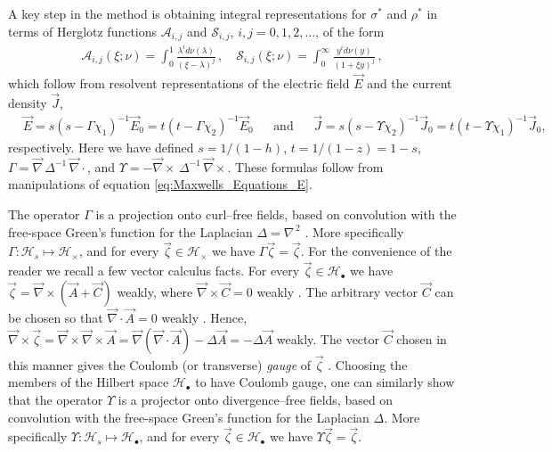 \documentclass[english,12pt,jmp,graphicx]{revtex4-1}
\begin{document}
A key step in the method is obtaining integral representations for
$\sigma^*$ and $\rho^*$ in terms of Herglotz functions $\mathcal{A}_{i,j}$ and
$\mathcal{S}_{i,j}$, $i,j=0,1,2,\ldots$, of the form \cite{Henrici:1974:v3}  
%
\begin{align}\label{eq:Integral_Reps}
  \mathcal{A}_{i,j}(\xi;\nu)=\int_0^1\frac{\lambda^id\nu(\lambda)}{(\xi-\lambda)^j}\,, \quad  
  \mathcal{S}_{i,j}(\xi;\nu)=\int_0^\infty\frac{y^id\nu(y)}{(1+\xi y)^j}\,,
\end{align}
%
which follow from resolvent representations of the electric field
$\vec{E}$ and the current density $\vec{J}$,     
%
\begin{align}\label{eq:Resolvent_representations_E_D}
  &\vec{E}=s(s-\Gamma\chi_1)^{-1}\vec{E}_0=t(t-\Gamma\chi_2)^{-1}\vec{E}_0 &&\text{and}
  &&\vec{J}=s(s-\Upsilon\chi_2)^{-1}\vec{J}_0=t(t-\Upsilon\chi_1)^{-1}\vec{J}_0,
\end{align}
%
respectively. Here we have defined $s=1/(1-h)$,
$t=1/(1-z)=1-s$, $\Gamma=\vec{\nabla}\,\Delta^{-1}\,\vec{\nabla}\cdot$, and
$\Upsilon=-\vec{\nabla}\times\,\Delta^{-1}\,\vec{\nabla}\times$. These formulas follow from
manipulations of equation \eqref{eq:Maxwells_Equations_E}.

The operator $\Gamma$ is a projection onto curl--free fields, based on
convolution with the free-space Green's function for the Laplacian
$\Delta=\nabla^{\,2}$ \cite{Golden:CMP-473}. More specifically
$\Gamma:\mathscr{H}_s\mapsto\mathscr{H}_\times$, and for every 
$\vec{\zeta}\in\mathscr{H}_\times$ we have $\Gamma\vec{\zeta}=\vec{\zeta}$. 
For the convenience of the reader we recall a few vector calculus
facts. For every $\vec{\zeta}\in\mathscr{H}_\bullet$ we have
$\vec{\zeta}=\vec{\nabla}\times(\vec{A}+\vec{C})$ weakly, where $\vec{\nabla}\times\vec{C}=0$
weakly \cite{Jackson-1999,Folland:95}. The arbitrary vector $\vec{C}$
can be chosen so that $\vec{\nabla}\cdot\vec{A}=0$ weakly
\cite{Jackson-1999}. Hence, $\vec{\nabla}\times\vec{\zeta}=\vec{\nabla}\times\vec{\nabla}\times\vec{A}
=\vec{\nabla}(\vec{\nabla}\cdot\vec{A})-\Delta\vec{A}=-\Delta\vec{A}$ weakly. The vector
$\vec{C}$ chosen in this manner gives the Coulomb (or transverse)
\emph{gauge} of $\vec{\zeta}$ \cite{Jackson-1999}. Choosing the members of
the Hilbert space $\mathscr{H}_{\bullet}$ to have Coulomb gauge, one can 
similarly show that the operator $\Upsilon$ is a projector onto
divergence--free fields, based on convolution with the free-space
Green's function for the Laplacian $\Delta$. More specifically
$\Upsilon:\mathscr{H}_s\mapsto\mathscr{H}_\bullet$, and for every $\vec{\zeta}\in\mathscr{H}_\bullet$
we have $\Upsilon\vec{\zeta}=\vec{\zeta}$.   
\end{document}
